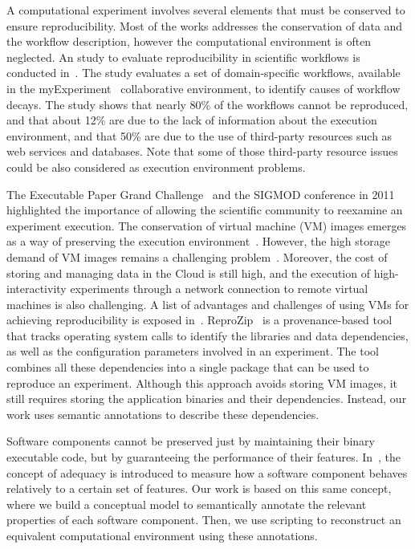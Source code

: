 
A computational experiment involves several elements that must be conserved to ensure reproducibility. Most of the works addresses the conservation of data and the workflow description, however the computational environment is often neglected. 
An study to evaluate reproducibility in scientific workflows is conducted in~\cite{zhao2012}. The study evaluates a set of domain-specific workflows, available in the myExperiment~\cite{myExperiment} collaborative environment, to identify causes of workflow decays. The study shows that nearly 80\% of the workflows cannot be reproduced, and that about 12\% are due to the lack of information about the execution environment, and that 50\% are due to the use of third-party resources such as web services and databases. Note that some of those third-party resource issues could be also considered as execution environment problems. 

The Executable Paper Grand Challenge~\cite{elsevierchallenge} and the SIGMOD conference in 2011~\cite{SIGMOD} highlighted the importance of allowing the scientific community to reexamine an experiment execution. The conservation of virtual machine (VM) images emerges as a way of preserving the execution environment~\cite{Brammer,SHARE}. However, the high storage demand of VM images remains a challenging problem~\cite{Mao:2014:ROD:2600090.2512348,6552826}. Moreover, the cost of storing and managing data in the Cloud is still high, and the execution of high-interactivity experiments through a network connection to remote virtual machines is also challenging. A list of advantages and challenges of using VMs for achieving reproducibility is exposed in~\cite{Howe2012}. ReproZip~\cite{reprozip} is a provenance-based tool that tracks operating system calls to identify the libraries and data dependencies, as well as the configuration parameters involved in an experiment. The tool combines all these dependencies into a single package that can be used to reproduce an experiment. Although this approach avoids storing VM images, it still requires storing the application binaries and their dependencies. Instead, our work uses semantic annotations to describe these dependencies.

Software components cannot be preserved just by maintaining their binary executable code, but by guaranteeing the performance of their features. In~\cite{Matthews}, the concept of adequacy is introduced to measure how a software component behaves relatively to a certain set of features. Our work is based on this same concept, where we build a conceptual model to semantically annotate the relevant properties of each software component. Then, we use scripting to reconstruct an equivalent computational environment using these annotations.

